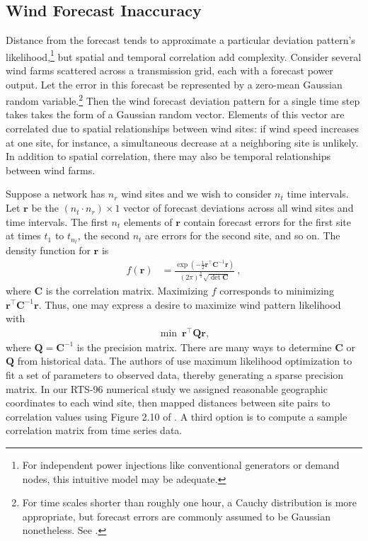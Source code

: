 \documentclass[journal,twoside]{IEEEtran}
\renewcommand{\vec}[1]{\mathbf{#1}}
\begin{document}
\subsection{Wind Forecast Inaccuracy}\label{sec:models-wind}
Distance from the forecast tends to approximate a particular deviation pattern's likelihood,\footnote{For independent power injections like conventional generators or demand nodes, this intuitive model may be adequate.} but spatial and temporal correlation add complexity. Consider several wind farms scattered across a transmission grid, each with a forecast power output. Let the error in this forecast be represented by a zero-mean Gaussian random variable.\footnote{For time scales shorter than roughly one hour, a Cauchy distribution is more appropriate, but forecast errors are commonly assumed to be Gaussian nonetheless. See \cite{hodge2011}.} Then the wind forecast deviation pattern for a single time step takes takes the form of a Gaussian random vector. Elements of this vector are correlated due to spatial relationships between wind sites: if wind speed increases at one site, for instance, a simultaneous decrease at a neighboring site is unlikely. In addition to spatial correlation, there may also be temporal relationships between wind farms.

Suppose a network has $n_r$ wind sites and we wish to consider $n_t$ time intervals. Let $\vec{r}$ be the $(n_t\cdot n_r)\times 1$ vector of forecast deviations across all wind sites and time intervals. The first $n_t$ elements of $\vec{r}$ contain forecast errors for the first site at times $t_1$ to $t_{n_t}$, the second $n_t$ are errors for the second site, and so on. The density function for $\vec{r}$ is
\begin{align}
f(\vec{r}) &= \frac{\exp \left(-\frac{1}{2} \vec{r}^\top \mathbf{C}^{-1} \vec{r} \right)}{(2\pi)^{\frac{n}{2}}\sqrt{\det \mathbf{C}}}~,
\end{align}
where $\mathbf{C}$ is the correlation matrix. Maximizing $f$ corresponds to minimizing $\vec{r}^\top \mathbf{C}^{-1} \vec{r}$. Thus, one may express a desire to maximize wind pattern likelihood with
\begin{align}
\label{eq:obj}\min~ \vec{r}^\top \mathbf{Q} \vec{r},
\end{align}
where $\mathbf{Q}=\mathbf{C}^{-1}$ is the precision matrix. There are many ways to determine $\mathbf{C}$ or $\mathbf{Q}$ from historical data. The authors of \cite{tastu2015} use maximum likelihood optimization to fit a set of parameters to observed data, thereby generating a sparse precision matrix. In our RTS-96 numerical study we assigned reasonable geographic coordinates to each wind site, then mapped distances between site pairs to correlation values using Figure 2.10 of \cite{freris2008}. A third option is to compute a sample correlation matrix from time series data.
\end{document}
